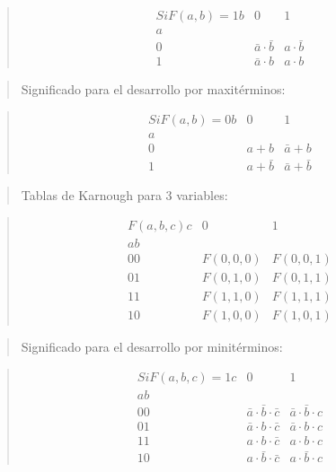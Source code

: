 \documentclass[
]{article}
\begin{document}
\begin{quote}
\[\begin{matrix}
{\mathit{Si}F{{({a,b})} = 1}b} & 0 & 1 \\
a & & \\
0 & {\bar{a} \cdot \bar{b}} & {a \cdot \bar{b}} \\
1 & {\bar{a} \cdot b} & {a \cdot b}
\end{matrix}\]
\end{quote}

\begin{quote}
Significado para el desarrollo por maxitérminos:
\end{quote}

\begin{quote}
\[\begin{matrix}
{\mathit{Si}F{{({a,b})} = 0}b} & 0 & 1 \\
a & & \\
0 & {a + b} & {\bar{a} + b} \\
1 & {a + \bar{b}} & {\bar{a} + \bar{b}}
\end{matrix}\]
\end{quote}

\begin{quote}
Tablas de Karnough para 3 variables:
\end{quote}

\begin{quote}
\[\begin{matrix}
{F{({a,b,c})}c} & 0 & 1 \\
\mathit{ab} & & \\
00 & {F{({0,0,0})}} & {F{({0,0,1})}} \\
01 & {F{({0,1,0})}} & {F{({0,1,1})}} \\
11 & {F{({1,1,0})}} & {F{({1,1,1})}} \\
10 & {F{({1,0,0})}} & {F{({1,0,1})}}
\end{matrix}\]
\end{quote}

\begin{quote}
Significado para el desarrollo por minitérminos:
\end{quote}

\begin{quote}
\[\begin{matrix}
{\mathit{Si}F{{({a,b,c})} = 1}c} & 0 & 1 \\
\mathit{ab} & & \\
00 & {{\bar{a} \cdot \bar{b}} \cdot \bar{c}} & {{\bar{a} \cdot \bar{b}} \cdot c} \\
01 & {{\bar{a} \cdot b} \cdot \bar{c}} & {{\bar{a} \cdot b} \cdot c} \\
11 & {{a \cdot b} \cdot \bar{c}} & {{a \cdot b} \cdot c} \\
10 & {{a \cdot \bar{b}} \cdot \bar{c}} & {{a \cdot \bar{b}} \cdot c}
\end{matrix}\]
\end{quote}
\end{document}
